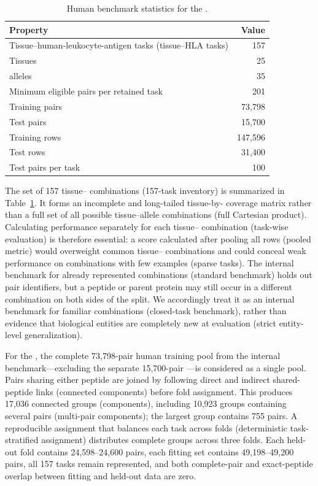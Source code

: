 \begin{table}[tbp]
\centering
\caption{Human benchmark statistics for the \plainFixedTest{}.}
\label{tab:human-benchmark-stats}
\small
\begin{tabular}{lr}
\toprule
Property & Value \\
\midrule
Tissue--human-leukocyte-antigen tasks (tissue--HLA tasks) & 157 \\
Tissues & 25 \\
\plainHLA{} alleles & 35 \\
Minimum eligible pairs per retained task & 201 \\
Training pairs & 73,798 \\
Test pairs & 15,700 \\
Training rows & 147,596 \\
Test rows & 31,400 \\
Test pairs per task & 100 \\
\bottomrule
\end{tabular}
\end{table}

The set of 157 tissue--\plainHLA{} combinations (157-task inventory) is summarized in Table~\ref{tab:human-benchmark-stats}. It forms an incomplete and long-tailed tissue-by-\plainHLA{} coverage matrix rather than a full set of all possible tissue--allele combinations (full Cartesian product). Calculating performance separately for each tissue--\plainHLA{} combination (task-wise evaluation) is therefore essential: a score calculated after pooling all rows (pooled metric) would overweight common tissue--\plainHLA{} combinations and could conceal weak performance on combinations with few examples (sparse tasks). The internal benchmark for already represented combinations (standard benchmark) holds out pair identifiers, but a peptide or parent protein may still occur in a different combination on both sides of the split. We accordingly treat it as an internal benchmark for familiar combinations (closed-task benchmark), rather than evidence that biological entities are completely new at evaluation (strict entity-level generalization).

For the \plainPeptideOOF{}, the complete 73,798-pair human training pool from the internal benchmark---excluding the separate 15,700-pair \plainFixedTest{}---is considered as a single pool. Pairs sharing either peptide are joined by following direct and indirect shared-peptide links (connected components) before fold assignment. This produces 17,036 connected groups (components), including 10,923 groups containing several pairs (multi-pair components); the largest group contains 755 pairs. A reproducible assignment that balances each task across folds (deterministic task-stratified assignment) distributes complete groups across three folds. Each held-out fold contains 24,598--24,600 pairs, each fitting set contains 49,198--49,200 pairs, all 157 tasks remain represented, and both complete-pair and exact-peptide overlap between fitting and held-out data are zero.

